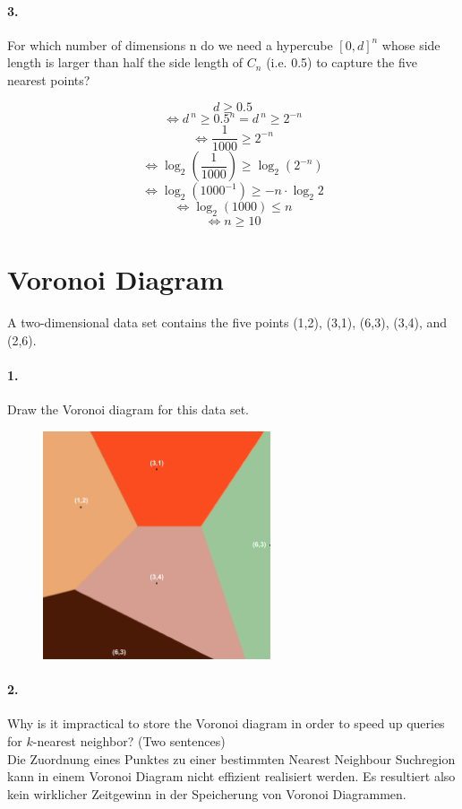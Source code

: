 \documentclass[a4paper,11pt,twoside]{scrartcl}
\begin{document}
\paragraph*{3.}  For which number of dimensions n do we need a hypercube $[0,d]^n$ whose side length is larger than half  the side length of $C_n$ (i.e. 0.5) to capture the five nearest points?

\[d \geq 0.5 \]
\[\Leftrightarrow d^{\:n} \geq 0.5^n = d^{\:n} \geq 2^{-n}  \]
\[\Leftrightarrow \frac{1}{1000} \geq 2^{-n} \]
\[\Leftrightarrow \log_2{\left(\frac{1}{1000}\right)} \geq \log_2{(2^{-n})} \]
\[\Leftrightarrow \log_2{\left(1000^{-1}\right)} \geq -n \cdot \log_2{2} \]
\[\Leftrightarrow \log_2{\left(1000\right)} \leq n \]
\[\Leftrightarrow n \geq 10 \]

\pagebreak

\section*{Voronoi Diagram}

A two-dimensional data set contains the five points (1,2), (3,1), (6,3), (3,4), and (2,6).
\paragraph*{1.} Draw the Voronoi diagram for this data set.
\begin{figure}[H]
\center
\includegraphics[width=0.6\textwidth]{images/voronoi_diagram.png}
\end{figure}




\paragraph*{2.} Why is it impractical to store the Voronoi diagram in order to speed up queries for $k$-nearest neighbor? (Two sentences) \\

Die Zuordnung eines Punktes zu einer bestimmten Nearest Neighbour Suchregion kann in einem Voronoi Diagram nicht effizient realisiert werden. Es resultiert also kein wirklicher Zeitgewinn in der Speicherung von Voronoi Diagrammen.
\end{document}
